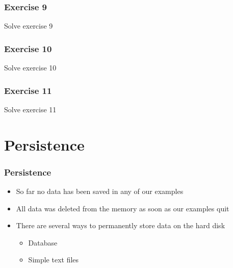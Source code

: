 \documentclass[10pt, a4paper]{beamer} %
\begin{document}
{
\bfseries
\begin{frame}[c]\frametitle{Exercise 9}
  Solve exercise 9
\end{frame}

\begin{frame}[c]\frametitle{Exercise 10}
Solve exercise 10
\end{frame}

\begin{frame}[c, fragile]\frametitle{Exercise 11}
Solve exercise 11
\end{frame}

}


\section{Persistence} %
\label{sec:persistence}

\begin{frame}[c, fragile]\frametitle{Persistence}
\begin{itemize}
  \item So far no data has been saved in any of our examples
  \item All data was deleted from the memory as soon as our examples quit
  \item There are several ways to permanently store data on the hard disk
  \begin{itemize}
    \item Database
    \item Simple text files
  \end{itemize}
\end{itemize}
\end{frame}
\end{document}
